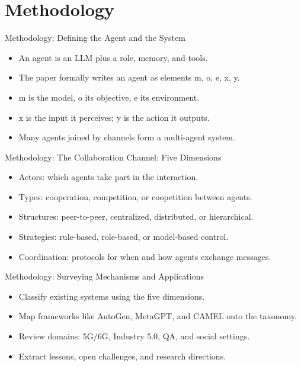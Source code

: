 \documentclass[10pt]{beamer}
\begin{document}
\section{Methodology}
\begin{frame}[allowframebreaks]{Methodology: Defining the Agent and the System}
\begin{itemize}
  \item An agent is an LLM plus a role, memory, and tools.
  \item The paper formally writes an agent as elements m, o, e, x, y.
  \item m is the model, o its objective, e its environment.
  \item x is the input it perceives; y is the action it outputs.
  \item Many agents joined by channels form a multi-agent system.
\end{itemize}
\end{frame}
\begin{frame}[allowframebreaks]{Methodology: The Collaboration Channel: Five Dimensions}
\begin{itemize}
  \item Actors: which agents take part in the interaction.
  \item Types: cooperation, competition, or coopetition between agents.
  \item Structures: peer-to-peer, centralized, distributed, or hierarchical.
  \item Strategies: rule-based, role-based, or model-based control.
  \item Coordination: protocols for when and how agents exchange messages.
\end{itemize}
\end{frame}
\begin{frame}[allowframebreaks]{Methodology: Surveying Mechanisms and Applications}
\begin{itemize}
  \item Classify existing systems using the five dimensions.
  \item Map frameworks like AutoGen, MetaGPT, and CAMEL onto the taxonomy.
  \item Review domains: 5G/6G, Industry 5.0, QA, and social settings.
  \item Extract lessons, open challenges, and research directions.
\end{itemize}
\end{frame}
\end{document}
